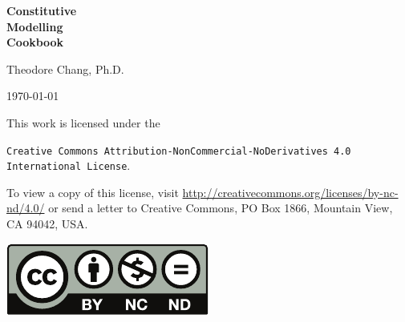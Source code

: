 \begin{titlepage}
\vspace*{\fill}
\begin{flushleft}\fontsize{40}{80}\selectfont
\textbf{Constitutive\\\hspace*{2cm}Modelling\\\hspace*{4cm}Cookbook}
\end{flushleft}
\vspace*{4cm}
\begin{flushright}\LARGE
Theodore Chang, Ph.D.\end{flushright}
\vspace*{2cm}
\begin{center}
\today
\end{center}
\vspace*{\fill}
\end{titlepage}
\clearpage
\vspace*{\fill}
This work is licensed under the
\begin{center}\texttt{Creative Commons Attribution-NonCommercial-NoDerivatives 4.0 International License}.
\end{center}
To view a copy of this license, visit \url{http://creativecommons.org/licenses/by-nc-nd/4.0/} or send a letter to Creative Commons, PO Box 1866, Mountain View, CA 94042, USA.
\begin{center}
\includegraphics{PIC/MISC/by-nc-nd}
\end{center}
\clearpage